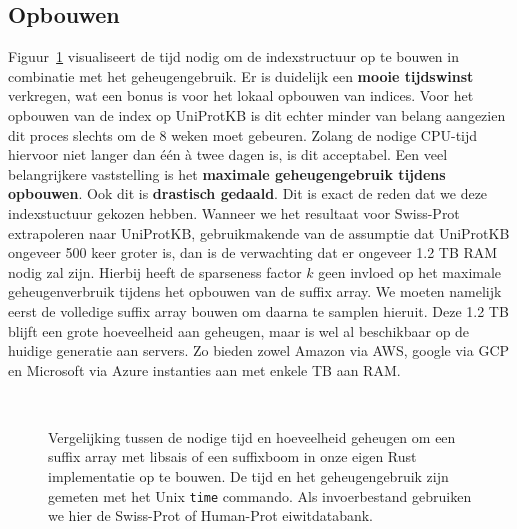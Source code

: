\subsection{Opbouwen}\label{subsec:opbouwen}
Figuur~\ref{fig:array_building} visualiseert de tijd nodig om de indexstructuur op te bouwen in combinatie met het geheugengebruik.
Er is duidelijk een \textbf{mooie tijdswinst} verkregen, wat een bonus is voor het lokaal opbouwen van indices.
Voor het opbouwen van de index op UniProtKB is dit echter minder van belang aangezien dit proces slechts om de 8 weken moet gebeuren.
Zolang de nodige CPU-tijd hiervoor niet langer dan één à twee dagen is, is dit acceptabel.
Een veel belangrijkere vaststelling is het \textbf{maximale geheugengebruik tijdens opbouwen}.
Ook dit is \textbf{drastisch gedaald}.
Dit is exact de reden dat we deze indexstuctuur gekozen hebben.
Wanneer we het resultaat voor Swiss-Prot extrapoleren naar UniProtKB, gebruikmakende van de assumptie dat UniProtKB ongeveer 500 keer groter is, dan is de verwachting dat er ongeveer 1.2 TB RAM nodig zal zijn.
Hierbij heeft de sparseness factor $k$ geen invloed op het maximale geheugenverbruik tijdens het opbouwen van de suffix array.
We moeten namelijk eerst de volledige suffix array bouwen om daarna te samplen hieruit.
Deze 1.2 TB blijft een grote hoeveelheid aan geheugen, maar is wel al beschikbaar op de huidige generatie aan servers.
Zo bieden zowel Amazon via AWS, google via GCP en Microsoft via Azure instanties aan met enkele TB aan RAM\@.

\begin{figure}[H]
    \centering
    \\[4ex] %

    \caption{Vergelijking tussen de nodige tijd en hoeveelheid geheugen om een suffix array met libsais of een suffixboom in onze eigen Rust implementatie op te bouwen. De tijd en het geheugengebruik zijn gemeten met het Unix \texttt{time} commando. Als invoerbestand gebruiken we hier de Swiss-Prot of Human-Prot eiwitdatabank.}\label{fig:array_building}
\end{figure}

